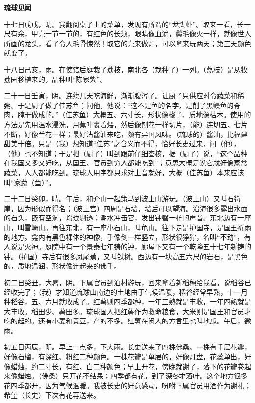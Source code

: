 \documentclass[12pt,UTF-8,openany]{ctexbook}
\begin{document}
\begin{normalsize}
    \begin{center}
        \textbf{琉球见闻}
    \end{center}
    
    十七日戊戌，晴。我翻阅桌子上的菜单，发现有所谓的“龙头虾”。取来一看，长一尺有余，甲壳一节一节的，有红色的长须，眼睛像血滴，鬃毛像火一样，就像世人所画的龙头，看了令人毛骨悚然！取它的壳来做灯，可以拿来玩两天；第三天颜色就变了。
    
    十八日己亥，雨。在使馆后庭栽了荔枝，南北各（栽种了）一列。（荔枝）是从牧荔园移植来的，品种叫“陈家紫”。
    
    二十一日壬寅，阴。连续几天吃海鲜，渐渐腹泻了。让厨子只供应时令蔬菜和稀粥。于是厨子做了佳苏鱼；问他，他说：“这不是鱼的名字，是削了黑鳗鱼的脊肉，腌干做成的。”（佳苏鱼）大概五、六寸长，形状像梭子、质地像枯木。使用的方法是先用温水浸洗，用蕉叶裹着煨，然后像刨花一样切片，（能）连切五、七片不断，好像兰花一样；最好沾酱油来吃，颇有异国风味。（琉球的）酱油，比福建甜美十倍。只是（我）想知道“佳苏”之含义而不得，恰好长史过来，问（他），（他）也不知道；于是把（厨子）叫到跟前仔细查核，据（厨子）说，“这个品种在我国又多又好吃，从国王、官员到穷人都能吃到”；意思大概是说它就好像家常蔬菜，人人都能吃到。琉球人用字都只求对上音就好，大概（佳苏鱼）本来应该叫“家蔬（鱼）”。
    
    二十二日癸卯，晴。午后，和介山一起策马到波上山游玩。（波上山）又叫石筍崖，因为形似而得名；（波上宫）四周是石墙，墙后可以望海。沿海很多露出水面的石头，嵌有空洞，玲珑剔透；潮水冲击它，发出钟磬一样的声音。东北边有一座山，叫雪崎山。再往东北，有一座小石山，叫龟山。往下走是护国寺，是国王祈雨的地方。龛内有黑色裸体的神像，手像剑一样竖立，形状很狰狞，名叫“不动”，有人说是火神。庭院中有一个景泰七年铸的钟，廊屋下又有一个乾隆五十七年新铸的钟。（护国）寺后有很多凤尾蕉，又叫铁树。西边有一块高五六尺的岩石，是黑色的，质地温润，形状像连起来的佛手。
    
    初二日癸丑，大暑，阴。下属官员到泊村游玩，回来拿着新稻穗给我看，说稻谷已经收完了；（我）才知道琉球山南边的土地由于气候温暖，稻谷经常早熟，十一月种稻谷，五、六月就收成了。红薯则四季都种，一年三熟就是丰收，一年四熟就是大丰收。稻田少、薯田多。琉球国人把红薯作为救命粮食，大米则是国王和官员才吃的起的。还有小麦和黄豆，产的不多。红薯在闽人的方言里也叫地瓜。午后，微雨。
    
    初五日丙辰，阴。早上十点多，下大雨。长史送来了四株佛桑。一株有千层花瓣，好像石榴，有深红、粉红二种颜色。一株花瓣是单层的，好像灯盘，花蕊单出，好像蜡烛，约二寸长，有红、白二种颜色；早上开花，傍晚就谢了，落下的花瓣卷起来像蜡烛。（佛桑）只开花不结果；四季都有花，到了深冬才落叶。这个地方很多花四季都开，因为气候温暖。我被长史的好意感动，吩咐下属官员用酒作为谢礼；希望（长史）下次有花再送来。
    

\end{normalsize}
\end{document}
